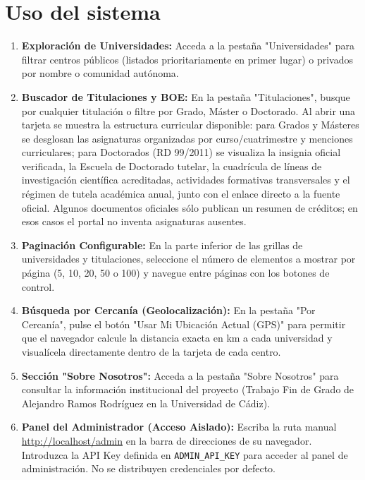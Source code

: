 \section{Uso del sistema}
\begin{enumerate}
    \item \textbf{Exploración de Universidades:} Acceda a la pestaña "Universidades" para filtrar centros públicos (listados prioritariamente en primer lugar) o privados por nombre o comunidad autónoma.
    \item \textbf{Buscador de Titulaciones y BOE:} En la pestaña "Titulaciones", busque por cualquier titulación o filtre por Grado, Máster o Doctorado. Al abrir una tarjeta se muestra la estructura curricular disponible: para Grados y Másteres se desglosan las asignaturas organizadas por curso/cuatrimestre y menciones curriculares; para Doctorados (RD 99/2011) se visualiza la insignia oficial verificada, la Escuela de Doctorado tutelar, la cuadrícula de líneas de investigación científica acreditadas, actividades formativas transversales y el régimen de tutela académica anual, junto con el enlace directo a la fuente oficial. Algunos documentos oficiales sólo publican un resumen de créditos; en esos casos el portal no inventa asignaturas ausentes.
    \item \textbf{Paginación Configurable:} En la parte inferior de las grillas de universidades y titulaciones, seleccione el número de elementos a mostrar por página (5, 10, 20, 50 o 100) y navegue entre páginas con los botones de control.
    \item \textbf{Búsqueda por Cercanía (Geolocalización):} En la pestaña "Por Cercanía", pulse el botón "Usar Mi Ubicación Actual (GPS)" para permitir que el navegador calcule la distancia exacta en km a cada universidad y visualícela directamente dentro de la tarjeta de cada centro.
    \item \textbf{Sección "Sobre Nosotros":} Acceda a la pestaña "Sobre Nosotros" para consultar la información institucional del proyecto (Trabajo Fin de Grado de Alejandro Ramos Rodríguez en la Universidad de Cádiz).
    \item \textbf{Panel del Administrador (Acceso Aislado):} Escriba la ruta manual \url{http://localhost/admin} en la barra de direcciones de su navegador. Introduzca la API Key definida en \texttt{ADMIN\_API\_KEY} para acceder al panel de administración. No se distribuyen credenciales por defecto.
\end{enumerate}
